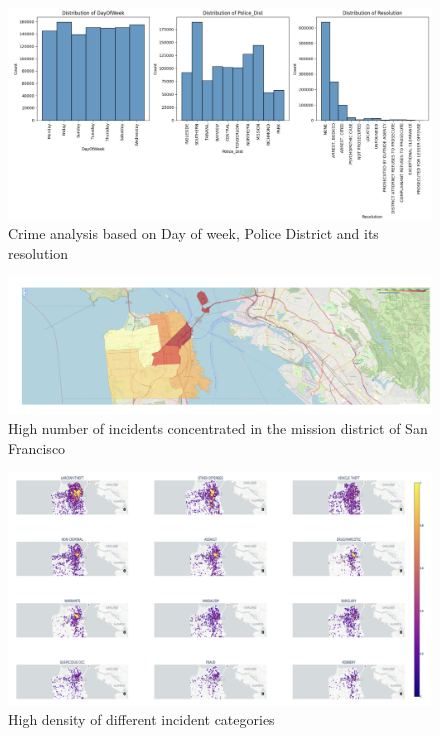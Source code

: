\documentclass[conference,final, 10pt]{IEEEtran}
\begin{document}
\begin{figure}

{\centering \includegraphics[width=1\linewidth]{img/fig1} 

}

\caption{Crime analysis based on Day of week, Police District and its resolution}\label{fig:unnamed-chunk-1}
\end{figure}

\begin{figure}

{\centering \includegraphics[width=0.9\linewidth]{img/fig2} 

}

\caption{High number of incidents concentrated in the mission district of San Francisco}\label{fig:unnamed-chunk-2}
\end{figure}

\begin{figure}

{\centering \includegraphics[width=0.9\linewidth]{img/fig3} 

}

\caption{High density of different incident categories}\label{fig:unnamed-chunk-3}
\end{figure}
\end{document}
